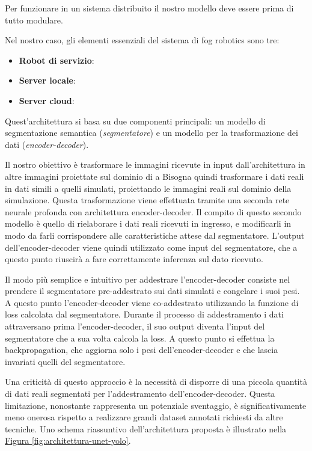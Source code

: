\documentclass[12pt]{report}
\begin{document}
Per funzionare in un sistema distribuito il nostro modello deve essere prima di tutto modulare.

Nel nostro caso, gli elementi essenziali del sistema di fog robotics sono tre:

\begin{itemize}
	\item \textbf{Robot di servizio}: 
	\item \textbf{Server locale}:
	\item \textbf{Server cloud}:
\end{itemize}

Quest'architettura si basa su due componenti principali: un modello di segmentazione semantica (\textit{segmentatore}) e un modello per la trasformazione dei dati (\textit{encoder-decoder}).

Il nostro obiettivo è trasformare le immagini ricevute in input dall'architettura in altre immagini proiettate sul dominio di a
Bisogna quindi trasformare i dati reali in dati simili a quelli simulati, proiettando le immagini reali sul dominio della simulazione. Questa trasformazione viene effettuata tramite una seconda rete neurale profonda con architettura encoder-decoder. Il compito di questo secondo modello è quello di rielaborare i dati reali ricevuti in ingresso, e modificarli in modo da farli corrispondere alle caratteristiche attese dal segmentatore. L'output dell'encoder-decoder viene quindi utilizzato come input del segmentatore, che a questo punto riuscirà a fare correttamente inferenza sul dato ricevuto.

Il modo più semplice e intuitivo per addestrare l'encoder-decoder consiste nel prendere il segmentatore pre-addestrato sui dati simulati e congelare i suoi pesi. A questo punto l'encoder-decoder viene co-addestrato utilizzando la funzione di loss calcolata dal segmentatore. Durante il processo di addestramento i dati attraversano prima l'encoder-decoder, il suo output diventa l'input del segmentatore che a sua volta calcola la loss. A questo punto si effettua la backpropagation, che aggiorna solo i pesi dell'encoder-decoder e che lascia invariati quelli del segmentatore.

Una criticità di questo approccio è la necessità di disporre di una piccola quantità di dati reali segmentati per l'addestramento dell'encoder-decoder. Questa limitazione, nonostante rappresenta un potenziale sventaggio, è significativamente meno onerosa rispetto a realizzare grandi dataset annotati richiesti da altre tecniche. Uno schema riassuntivo dell'architettura proposta è illustrato nella \hyperref[fig:architettura-unet-yolo]{Figura \ref{fig:architettura-unet-yolo}}.
\end{document}
